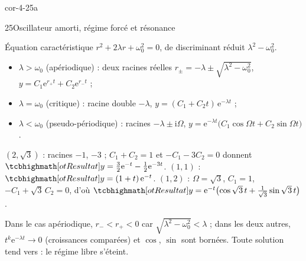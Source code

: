 
\begin{blocLivre}{cor-4-25a}
\begin{corrige}{25}{Oscillateur amorti, régime forcé et résonance}
\begin{questions}
  \item Équation caractéristique $r^{2}+2\lambda r+\omega_0^{2}=0$, de
    discriminant réduit $\lambda^{2}-\omega_0^{2}$.
    \begin{itemize}[label={\color{otNavy}\textbullet},leftmargin=1.2em,itemsep=0.4mm,topsep=0.6mm]
      \item $\lambda>\omega_0$ (apériodique) : deux racines réelles
        $r_\pm=-\lambda\pm\sqrt{\lambda^{2}-\omega_0^{2}}$,
        $y=C_1\mathrm{e}^{r_+t}+C_2\mathrm{e}^{r_-t}$ ;
      \item $\lambda=\omega_0$ (critique) : racine double $-\lambda$,
        $y=(C_1+C_2t)\,\mathrm{e}^{-\lambda t}$ ;
      \item $\lambda<\omega_0$ (pseudo-périodique) : racines
        $-\lambda\pm\mathrm{i}\Omega$,
        $y=\mathrm{e}^{-\lambda t}\bigl(C_1\cos\Omega t+C_2\sin\Omega t\bigr)$.
    \end{itemize}
  \item $(2,\sqrt3)$ : racines $-1$, $-3$ ; $C_1+C_2=1$ et
    $-C_1-3C_2=0$ donnent
    $\res{y=\tfrac32\mathrm{e}^{-t}-\tfrac12\mathrm{e}^{-3t}}$.
    $(1,1)$ : $\res{y=(1+t)\,\mathrm{e}^{-t}}$.
    $(1,2)$ : $\Omega=\sqrt3$, $C_1=1$, $-C_1+\sqrt3\,C_2=0$, d'où
    $\res{y=\mathrm{e}^{-t}\bigl(\cos\sqrt3\,t+\tfrac{1}{\sqrt3}\sin\sqrt3\,t\bigr)}$.
  \item Dans le cas apériodique, $r_-<r_+<0$ car
    $\sqrt{\lambda^{2}-\omega_0^{2}}<\lambda$ ; dans les deux autres,
    $t^{k}\mathrm{e}^{-\lambda t}\to0$ (croissances comparées) et
    $\cos$, $\sin$ sont bornées. Toute solution tend vers
     : le régime libre s'éteint.
\end{questions}
\begin{center}
\end{center}
\end{corrige}
\end{blocLivre}
